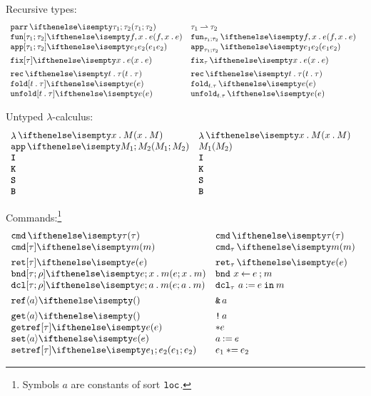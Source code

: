 \documentclass[11pt,twoside]{article}
\begin{document}
Recursive types:
\begin{displaymath}
  \begin{array}{l@{\quad}l@{\quad}l}

    \parrty{\tau_1}{\tau_2} & \parrty*{\tau_1}{\tau_2} \\
    \funex{f}{x}{e} & \funex*{f}{x}{e} \\
    \pappex{e_1}{e_2} & \pappex*{e_1}{e_2} \\[1ex]

    \fixex[\tau]{x}{e} & \fixex*[\tau]{x}{e}  \\[1ex]

    \recty{t}{\tau} & \recty*{t}{\tau} \\
    \foldex[t][\tau]{e}  & \foldex*{e} \\
    \unfoldex[t][\tau]{e} & \unfoldex*{e}
  \end{array}
\end{displaymath}

Untyped $\lambda$-calculus:
\begin{displaymath}
  \begin{array}{l@{\quad}l@{\quad}l}
    \ulamex{x}{M} & \ulamex*{x}{M} \\
    \uapex{M_1}{M_2} & \uapex*{M_1}{M_2} \\
    \uIex & \uIex* \\
    \uKex & \uKex* \\
    \uSex & \uSex& \\
    \uBex & \uBex*
  \end{array}
\end{displaymath}

Commands:\footnote{Symbols $a$ are constants of sort $\texttt{loc}$.}
\begin{displaymath}
  \begin{array}{l@{\quad}l@{\quad}l}
    \cmdty{\tau}  & \cmdty*{\tau} \\
    \cmdex[\tau]{m} & \cmdex*{m} \\[1ex]
    \retcmd[\tau]{e} & \retcmd*{e} \\
    \bndcmd{e}{x}{m} & \bndcmd*{e}{x}{m} \\
    \dclcmd{e}{a}{m} & \dclcmd*{e}{a}{m} \\[1ex]
    \refex{a} & \refex*{a} \\[1ex]
    \getcmd{a} & \getcmd*{a} \\
    \getrefcmd[\tau]{e} & \getrefcmd*{e} \\
    \setcmd{a}{e} & \setcmd*{a}{e} \\
    \setrefcmd[\tau]{e_1}{e_2} & \setrefcmd*[\tau]{e_1}{e_2}
 \end{array}
\end{displaymath}
\end{document}
